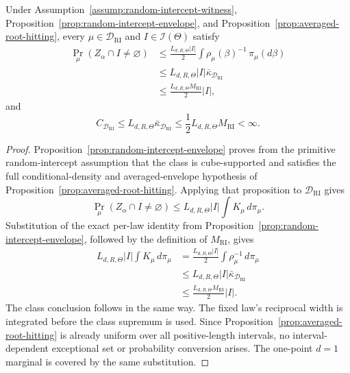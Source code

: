 \begin{proposition}
\label{prop:random-intercept-root-hitting}
Under Assumption~\ref{assump:random-intercept-witness},
Proposition~\ref{prop:random-intercept-envelope}, and
Proposition~\ref{prop:averaged-root-hitting}, every
$\mu\in\mathcal D_{\mathrm{RI}}$ and
$I\in\mathscr I(\Theta)$ satisfy
\[
\begin{aligned}
\Pr_\mu(Z_\alpha\cap I\neq\varnothing)
&\leq\frac{L_{d,R,\Theta}|I|}{2}
  \int\rho_\mu(\beta)^{-1}\,\pi_\mu(d\beta)\\
&\leq L_{d,R,\Theta}|I|
  \bar\kappa_{\mathcal D_{\mathrm{RI}}}\\
&\leq\frac{L_{d,R,\Theta}M_{\mathrm{RI}}}{2}|I|,
\end{aligned}
\]
and
\[
C_{\mathcal D_{\mathrm{RI}}}
\leq L_{d,R,\Theta}\bar\kappa_{\mathcal D_{\mathrm{RI}}}
\leq\frac12L_{d,R,\Theta}M_{\mathrm{RI}}<\infty.
\]
\end{proposition}

\begin{proof}
Proposition~\ref{prop:random-intercept-envelope} proves from the primitive
random-intercept assumption that the class is cube-supported and satisfies
the full conditional-density and averaged-envelope hypothesis of
Proposition~\ref{prop:averaged-root-hitting}.  Applying that proposition
to $\mathcal D_{\mathrm{RI}}$ gives
\[
\Pr_\mu(Z_\alpha\cap I\neq\varnothing)
\leq L_{d,R,\Theta}|I|\int K_\mu\,d\pi_\mu.
\]
Substitution of the exact per-law identity from
Proposition~\ref{prop:random-intercept-envelope}, followed by the
definition of $M_{\mathrm{RI}}$, gives
\[
\begin{aligned}
L_{d,R,\Theta}|I|\int K_\mu\,d\pi_\mu
&=\frac{L_{d,R,\Theta}|I|}{2}
  \int\rho_\mu^{-1}\,d\pi_\mu\\
&\leq L_{d,R,\Theta}|I|
      \bar\kappa_{\mathcal D_{\mathrm{RI}}}\\
&\leq\frac{L_{d,R,\Theta}M_{\mathrm{RI}}}{2}|I|.
\end{aligned}
\]
The class conclusion follows in the same way.  The fixed law's reciprocal
width is integrated before the class supremum is used.  Since
Proposition~\ref{prop:averaged-root-hitting} is already uniform over all
positive-length intervals, no interval-dependent exceptional set or
probability conversion arises.  The one-point $d=1$ marginal is covered
by the same substitution.
\end{proof}

